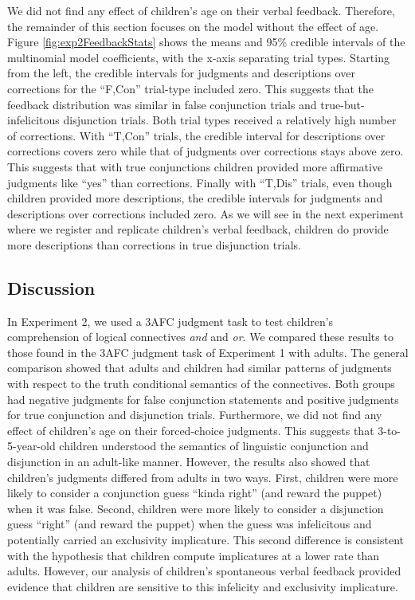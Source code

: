 \documentclass[
  english,
  ,man,floatsintext]{apa6}
\begin{document}
We did not find any effect of children's age on their verbal feedback. Therefore, the remainder of this section focuses on the model without the effect of age. Figure \ref{fig:exp2FeedbackStats} shows the means and 95\% credible intervals of the multinomial model coefficients, with the x-axis separating trial types. Starting from the left, the credible intervals for judgments and descriptions over corrections for the \enquote{F,Con} trial-type included zero. This suggests that the feedback distribution was similar in false conjunction trials and true-but-infelicitous disjunction trials. Both trial types received a relatively high number of corrections. With \enquote{T,Con} trials, the credible interval for descriptions over corrections covers zero while that of judgments over corrections stays above zero. This suggests that with true conjunctions children provided more affirmative judgments like \enquote{yes} than corrections. Finally with \enquote{T,Dis} trials, even though children provided more descriptions, the credible intervals for judgments and descriptions over corrections included zero. As we will see in the next experiment where we register and replicate children's verbal feedback, children do provide more descriptions than corrections in true disjunction trials.

\hypertarget{discussion-1}{%
\subsection{Discussion}\label{discussion-1}}

In Experiment 2, we used a 3AFC judgment task to test children's comprehension of logical connectives \emph{and} and \emph{or}. We compared these results to those found in the 3AFC judgment task of Experiment 1 with adults. The general comparison showed that adults and children had similar patterns of judgments with respect to the truth conditional semantics of the connectives. Both groups had negative judgments for false conjunction statements and positive judgments for true conjunction and disjunction trials. Furthermore, we did not find any effect of children's age on their forced-choice judgments. This suggests that 3-to-5-year-old children understood the semantics of linguistic conjunction and disjunction in an adult-like manner. However, the results also showed that children's judgments differed from adults in two ways. First, children were more likely to consider a conjunction guess \enquote{kinda right} (and reward the puppet) when it was false. Second, children were more likely to consider a disjunction guess \enquote{right} (and reward the puppet) when the guess was infelicitous and potentially carried an exclusivity implicature. This second difference is consistent with the hypothesis that children compute implicatures at a lower rate than adults. However, our analysis of children's spontaneous verbal feedback provided evidence that children are sensitive to this infelicity and exclusivity implicature.
\end{document}
